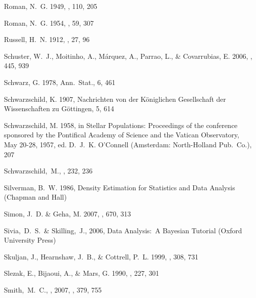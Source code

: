 \begin{thebibliography}{99}
{Roman}, N.~G. 1949, \apj, 110, 205

{Roman}, N.~G. 1954, \aj, 59, 307

{Russell}, H.~N. 1912, \aj, 27, 96

{Schuster}, W.~J., {Moitinho}, A., {M{\'a}rquez}, A., {Parrao}, L., \&
  {Covarrubias}, E. 2006, \aap, 445, 939

{Schwarz}, G. 1978, {Ann.~Stat.}, 6, 461

{Schwarzschild}, K. 1907, {Nachrichten von der K{\"o}niglichen Gesellschaft der
  Wissenschaften zu G{\"o}ttingen}, 5, {614}

{Schwarzschild}, M. 1958, in {Stellar Populations: Proceedings of the
  conference sponsored by the Pontifical Academy of Science and the Vatican
  Observatory, May 20-28, 1957}, ed. D.~J.~K. {O'Connell} ({Amsterdam}:
  {North-Holland Pub.~Co.}), 207

  Schwarzschild,~M.,
  \apj, 232, 236

{Silverman}, B.~W. 1986, {Density Estimation for Statistics and Data Analysis}
  ({Chapman and Hall})

{Simon}, J.~D. \& {Geha}, M. 2007, \apj, 670, 313

  Sivia,~D.~S.~\& Skilling,~J., 2006,
  Data Analysis:\ A Bayesian Tutorial (Oxford University Press)

{Skuljan}, J., {Hearnshaw}, J.~B., \& {Cottrell}, P.~L. 1999, \mnras, 308, 731

{Slezak}, E., {Bijaoui}, A., \& {Mars}, G. 1990, \aap, 227, 301

  Smith,~M.~C., \etal, 2007,
  \mnras, 379, 755


\end{thebibliography}
